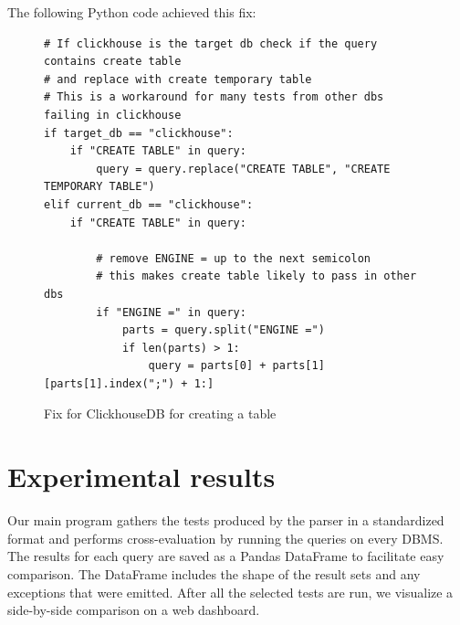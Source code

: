 \documentclass[acmsmall,nonacm]{acmart}
\begin{document}
The following Python code achieved this fix:



\begin{figure}[h!]
\begin{verbatim}
# If clickhouse is the target db check if the query contains create table
# and replace with create temporary table
# This is a workaround for many tests from other dbs failing in clickhouse
if target_db == "clickhouse":
    if "CREATE TABLE" in query:
        query = query.replace("CREATE TABLE", "CREATE TEMPORARY TABLE")
elif current_db == "clickhouse":
    if "CREATE TABLE" in query:
        
        # remove ENGINE = up to the next semicolon
        # this makes create table likely to pass in other dbs
        if "ENGINE =" in query:
            parts = query.split("ENGINE =")
            if len(parts) > 1:
                query = parts[0] + parts[1][parts[1].index(";") + 1:]
\end{verbatim}
\vspace{-0.2cm}
\caption{Fix for ClickhouseDB for creating a table}
\label{fig:tester.tcl}
\vspace{-0.2cm}
\end{figure}


\section{Experimental results}
Our main program gathers the tests produced by the parser in a standardized format and performs cross-evaluation by running the queries on every DBMS. The results for each query are saved as a Pandas DataFrame to facilitate easy comparison. The DataFrame includes the shape of the result sets and any exceptions that were emitted. After all the selected tests are run, we visualize a side-by-side comparison on a web dashboard.
\end{document}
